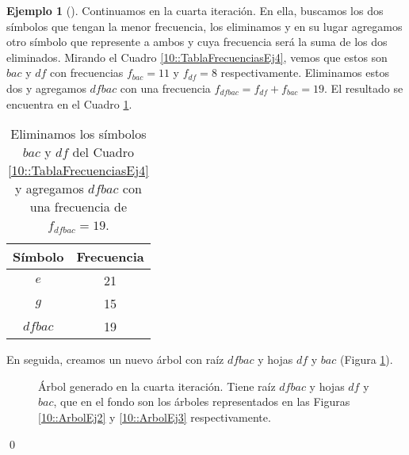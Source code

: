 \documentclass[english, spanish, fleqn, 10pt]{article}
\numberwithin{equation}{section}
\theoremstyle{definition}
\newtheorem{beforeExample}{Ejemplo}[section]
\newenvironment{ejemplo}[1][]{\begin{beforeExample}[#1]\renewcommand{\qedsymbol}{$\blacksquare$}}{\qed\end{beforeExample}}
\begin{document}
\begin{ejemplo}
	Continuamos en la cuarta iteración. En ella, buscamos los dos símbolos que tengan la menor frecuencia, los eliminamos y en su lugar agregamos otro símbolo que represente a ambos y cuya frecuencia será la suma de los dos eliminados. Mirando el Cuadro \ref{10::TablaFrecuenciasEj4}, vemos que estos son $bac$ y $df$ con frecuencias $f_{bac}=11$ y $f_{df}=8$ respectivamente. Eliminamos estos dos y agregamos $dfbac$ con una frecuencia $f_{dfbac}=f_{df}+f_{bac}=19$. El resultado se encuentra en el Cuadro \ref{10::TablaFrecuenciasEj5}.
	\begin{table}[!h]
		\centering
		\begin{tabular}{c|c}
			Símbolo & Frecuencia\\
			\hline
			$e$&21\\
			$g$&15\\
			$dfbac$&19
		\end{tabular}
		\caption{Eliminamos los símbolos $bac$ y $df$ del Cuadro \ref{10::TablaFrecuenciasEj4} y agregamos $dfbac$ con una frecuencia de $f_{dfbac}=19$.}
		\label{10::TablaFrecuenciasEj5}
	\end{table}
	En seguida, creamos un nuevo árbol con raíz $dfbac$ y hojas $df$ y $bac$ (Figura \ref{10::ArbolEj4}).
	\begin{figure}[!h]
		\centering
		\caption{Árbol generado en la cuarta iteración. Tiene raíz $dfbac$ y hojas $df$ y $bac$, que en el fondo son los árboles representados en las Figuras \ref{10::ArbolEj2} y \ref{10::ArbolEj3} respectivamente.}
		\label{10::ArbolEj4}
	\end{figure}
	

\end{ejemplo}
\end{document}

